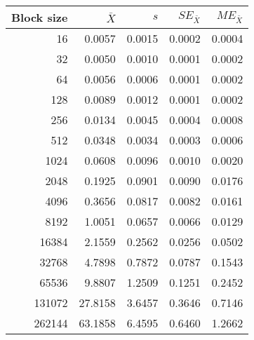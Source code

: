 \begin{tabular}{rrrrr}\toprule
{\small Block size} & $\bar{X}$ & $s$ & $SE_{\bar{X}}$ & $ME_{\bar{X}}$ \\\midrule
16 & 0.0057 & 0.0015 & 0.0002 & 0.0004\\
32 & 0.0050 & 0.0010 & 0.0001 & 0.0002\\
64 & 0.0056 & 0.0006 & 0.0001 & 0.0002\\
128 & 0.0089 & 0.0012 & 0.0001 & 0.0002\\
256 & 0.0134 & 0.0045 & 0.0004 & 0.0008\\
512 & 0.0348 & 0.0034 & 0.0003 & 0.0006\\
1024 & 0.0608 & 0.0096 & 0.0010 & 0.0020\\
2048 & 0.1925 & 0.0901 & 0.0090 & 0.0176\\
4096 & 0.3656 & 0.0817 & 0.0082 & 0.0161\\
8192 & 1.0051 & 0.0657 & 0.0066 & 0.0129\\
16384 & 2.1559 & 0.2562 & 0.0256 & 0.0502\\
32768 & 4.7898 & 0.7872 & 0.0787 & 0.1543\\
65536 & 9.8807 & 1.2509 & 0.1251 & 0.2452\\
131072 & 27.8158 & 3.6457 & 0.3646 & 0.7146\\
262144 & 63.1858 & 6.4595 & 0.6460 & 1.2662\\
\bottomrule
\end{tabular}
